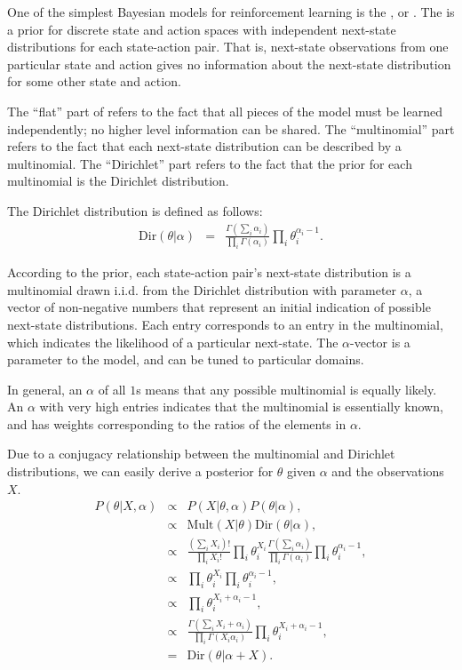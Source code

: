 One of the simplest Bayesian models for reinforcement learning is the , or . The  is a prior for discrete state and action spaces with independent next-state distributions for each state-action pair. That is, next-state observations from one particular state and action gives no information about the next-state distribution for some other state and action.

The ``flat'' part of  refers to the fact that all pieces of the model must be learned independently; no higher level information can be shared. The ``multinomial'' part refers to the fact that each next-state distribution can be described by a multinomial. The ``Dirichlet'' part refers to the fact that the prior for each multinomial is the Dirichlet distribution.

The Dirichlet distribution is defined as follows:
\begin{eqnarray}
\mbox{Dir}(\theta|\alpha) &=& \frac{\Gamma\left(\sum_i \alpha_i\right)}{\prod_i \Gamma(\alpha_i)} \prod_i \theta_i^{\alpha_i-1}.
\end{eqnarray}

According to the  prior, each state-action pair's next-state distribution is a multinomial drawn i.i.d. from the Dirichlet distribution with parameter $\alpha$, a vector of non-negative numbers that represent an initial indication of possible next-state distributions. Each entry corresponds to an entry in the multinomial, which indicates the likelihood of a particular next-state. The $\alpha$-vector is a parameter to the model, and can be tuned to particular domains.

In general, an $\alpha$ of all $1$s means that any possible multinomial is equally likely. An $\alpha$ with very high entries indicates that the multinomial is essentially known, and has weights corresponding to the ratios of the elements in $\alpha$.

Due to a conjugacy relationship between the multinomial and Dirichlet distributions, we can easily derive a posterior for $\theta$ given $\alpha$ and the observations $X$.
\begin{eqnarray}
P(\theta|X,\alpha) &\propto& P(X|\theta,\alpha) P(\theta|\alpha),\\
&\propto& \mbox{Mult}(X|\theta) \mbox{Dir}(\theta|\alpha),\\
&\propto& \frac{\left(\sum_i X_i\right)!}{\prod_i X_i!} \prod_i \theta_i^{X_i} \frac{\Gamma\left(\sum_i \alpha_i\right)}{\prod_i \Gamma(\alpha_i)} \prod_i \theta_i^{\alpha_i-1},\\
&\propto& \prod_i \theta_i^{X_i} \prod_i \theta_i^{\alpha_i-1},\\
&\propto& \prod_i \theta_i^{X_i+\alpha_i-1},\\
&\propto& \frac{\Gamma\left(\sum_i X_i+\alpha_i\right)}{\prod_i \Gamma(X_i\alpha_i)} \prod_i \theta_i^{X_i+\alpha_i-1},\\
&=& \mbox{Dir}(\theta|\alpha+X). \label{sec:models:dir-mult-conj}
\end{eqnarray}

